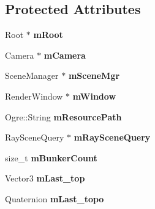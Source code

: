 \subsection*{Protected Attributes}
\begin{DoxyCompactItemize}
\item 
\hypertarget{class_p_f_d_application_a85b53105f5c34a392d9736d35344a14f}{
Root $\ast$ {\bfseries mRoot}}
\label{class_p_f_d_application_a85b53105f5c34a392d9736d35344a14f}

\item 
\hypertarget{class_p_f_d_application_a13b063de27c0e08d481bd1db5ad3d086}{
Camera $\ast$ {\bfseries mCamera}}
\label{class_p_f_d_application_a13b063de27c0e08d481bd1db5ad3d086}

\item 
\hypertarget{class_p_f_d_application_a1e54d30c765eee707433bdc1a11ac625}{
SceneManager $\ast$ {\bfseries mSceneMgr}}
\label{class_p_f_d_application_a1e54d30c765eee707433bdc1a11ac625}

\item 
\hypertarget{class_p_f_d_application_a6b8bedb542b6420726e5f9b0407ca122}{
RenderWindow $\ast$ {\bfseries mWindow}}
\label{class_p_f_d_application_a6b8bedb542b6420726e5f9b0407ca122}

\item 
\hypertarget{class_p_f_d_application_ae8cee9d5cad980e01ff7a9f6332b2e0d}{
Ogre::String {\bfseries mResourcePath}}
\label{class_p_f_d_application_ae8cee9d5cad980e01ff7a9f6332b2e0d}

\item 
\hypertarget{class_p_f_d_application_a71343a98ed075fa67aa3c97e6b6fd946}{
RaySceneQuery $\ast$ {\bfseries mRaySceneQuery}}
\label{class_p_f_d_application_a71343a98ed075fa67aa3c97e6b6fd946}

\item 
\hypertarget{class_p_f_d_application_a4d303799a2ea40815935e021ffa25e7e}{
size\_\-t {\bfseries mBunkerCount}}
\label{class_p_f_d_application_a4d303799a2ea40815935e021ffa25e7e}

\item 
\hypertarget{class_p_f_d_application_afe947a3f01dbbcbe4137a40fd651869e}{
Vector3 {\bfseries mLast\_\-top}}
\label{class_p_f_d_application_afe947a3f01dbbcbe4137a40fd651869e}

\item 
\hypertarget{class_p_f_d_application_a28f9a71963d74b97aa7290c04c4fec41}{
Quaternion {\bfseries mLast\_\-topo}}
\label{class_p_f_d_application_a28f9a71963d74b97aa7290c04c4fec41}


\end{DoxyCompactItemize}
